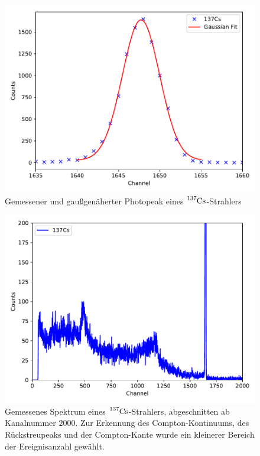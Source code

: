 \begin{figure}[H]
  \centering
  \includegraphics[scale=0.6]{content/plot22.pdf}
  \caption{Gemessener und gaußgenäherter Photopeak eines $\ce{^{137}Cs}$-Strahlers}
  \label{fig:plot22}
\end{figure}

\begin{figure}[H]
  \centering
  \includegraphics[scale=0.6]{content/plot21.pdf}
  \caption{Gemessenes Spektrum eines $\ce{^{137}Cs}$-Strahlers, abgeschnitten ab Kanalnummer $\num{2000}$. Zur Erkennung
    des Compton-Kontinuums, des Rückstreupeaks und der Compton-Kante wurde ein kleinerer Bereich der Ereignisanzahl gewählt.}
  \label{fig:plot21}
\end{figure}

